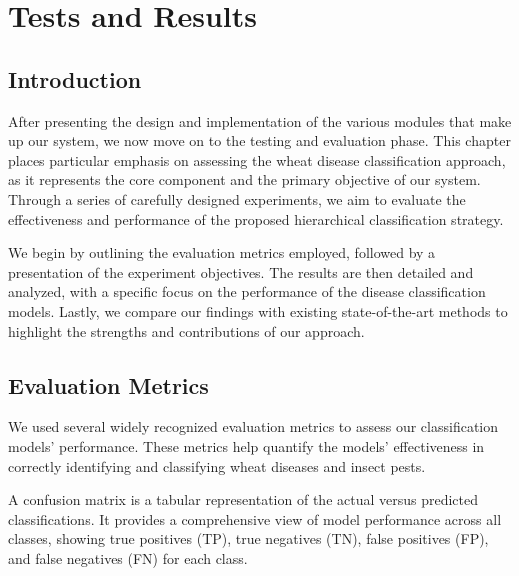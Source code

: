 \chapter{Tests and Results}

\section{Introduction}
After presenting the design and implementation of the various modules that make up our system, we now move on to the testing and evaluation phase. This chapter places particular emphasis on assessing the wheat disease classification approach, as it represents the core component and the primary objective of our system. Through a series of carefully designed experiments, we aim to evaluate the effectiveness and performance of the proposed hierarchical classification strategy.

We begin by outlining the evaluation metrics employed, followed by a presentation of the experiment objectives. The results are then detailed and analyzed, with a specific focus on the performance of the disease classification models. Lastly, we compare our findings with existing state-of-the-art methods to highlight the strengths and contributions of our approach.



\section{Evaluation Metrics}

We used several widely recognized evaluation metrics to assess our classification models' performance. These metrics help quantify the models' effectiveness in correctly identifying and classifying wheat diseases and insect pests.

A confusion matrix is a tabular representation of the actual versus predicted classifications. It provides a comprehensive view of model performance across all classes, showing true positives (TP), true negatives (TN), false positives (FP), and false negatives (FN) for each class.

